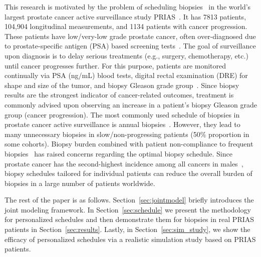 This research is motivated by the problem of scheduling biopsies~\citep{nieboer2018active} in the world's largest prostate cancer active surveillance study PRIAS~\citep{bokhorst2015compliance}. It has 7813 patients, 104,904 longitudinal measurements, and 1134 patients with cancer progression. These patients have low/very-low grade prostate cancer, often over-diagnosed due to prostate-specific antigen (PSA) based screening tests~\citep{crawford2003epidemiology}. The goal of surveillance upon diagnosis is to delay serious treatments (e.g., surgery, chemotherapy, etc.) until cancer progresses further. For this purpose, patients are monitored continually via PSA (ng/mL) blood tests, digital rectal examination (DRE) for shape and size of the tumor, and biopsy Gleason grade group~\citep{epsteinGG2014}. Since biopsy results are the strongest indicator of cancer-related outcomes, treatment is commonly advised upon observing an increase in a patient's biopsy Gleason grade group (cancer progression). The most commonly used schedule of biopsies in prostate cancer active surveillance is annual biopsies~\citep{loeb2014heterogeneity}. However, they lead to many unnecessary biopsies in slow/non-progressing patients (50\% proportion in some cohorts). Biopsy burden combined with patient non-compliance to frequent biopsies~\citep{bokhorst2015compliance} has raised concerns regarding the optimal biopsy schedule. Since prostate cancer has the second-highest incidence among all cancers in males~\citep{GlobalCancerStats2012}, biopsy schedules tailored for individual patients can reduce the overall burden of biopsies in a large number of patients worldwide.

The rest of the paper is as follows. Section~\ref{sec:jointmodel} briefly introduces the joint modeling framework. In Section~\ref{sec:schedule} we present the methodology for personalized schedules and then demonstrate them for biopsies in real PRIAS patients in Section~\ref{sec:results}. Lastly, in Section~\ref{sec:sim_study}, we show the efficacy of personalized schedules via a realistic simulation study based on PRIAS patients.